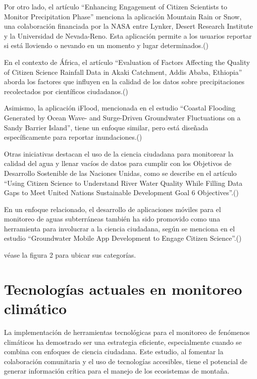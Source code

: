 Por otro lado, el artículo “Enhancing Engagement of Citizen Scientists to Monitor Precipitation Phase” menciona la aplicación Mountain Rain or Snow, una colaboración financiada por la NASA entre Lynker, Desert Research Institute y la Universidad de Nevada-Reno. Esta aplicación permite a los usuarios reportar si está lloviendo o nevando en un momento y lugar determinados.(\cite{lute2021enhancing})


En el contexto de África, el artículo “Evaluation of Factors Affecting the Quality of Citizen Science Rainfall Data in Akaki Catchment, Addis Ababa, Ethiopia” aborda los factores que influyen en la calidad de los datos sobre precipitaciones recolectados por científicos ciudadanos.(\cite{tedla2022evaluation}) 

Asimismo, la aplicación iFlood, mencionada en el estudio “Coastal Flooding Generated by Ocean Wave- and Surge-Driven Groundwater Fluctuations on a Sandy Barrier Island”, tiene un enfoque similar, pero está diseñada específicamente para reportar inundaciones.(\cite{elgar2021coastal}) 


Otras iniciativas destacan el uso de la ciencia ciudadana para monitorear la calidad del agua y llenar vacíos de datos para cumplir con los Objetivos de Desarrollo Sostenible de las Naciones Unidas, como se describe en el artículo “Using Citizen Science to Understand River Water Quality While Filling Data Gaps to Meet United Nations Sustainable Development Goal 6 Objectives”.(\cite{mcginn2021using})

En un enfoque relacionado, el desarrollo de aplicaciones móviles para el monitoreo de aguas subterráneas también ha sido promovido como una herramienta para involucrar a la ciencia ciudadana, según se menciona en el estudio “Groundwater Mobile App Development to Engage Citizen Science”.(\cite{dennis2019groundwater})



véase la figura 2 para ubicar sus categorías.














\section{Tecnologías actuales en monitoreo climático}
La implementación de herramientas tecnológicas para el monitoreo de fenómenos climáticos ha demostrado ser una estrategia eficiente, especialmente cuando se combina con enfoques de ciencia ciudadana. Este estudio, al fomentar la colaboración comunitaria y el uso de tecnologías accesibles, tiene el potencial de generar información crítica para el manejo de los ecosistemas de montaña.

